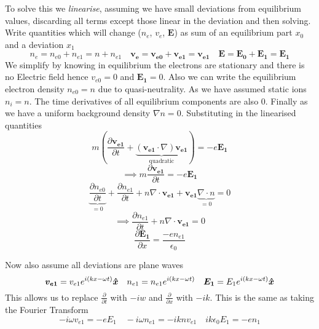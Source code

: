To solve this we \textit{linearise}, assuming we have small deviations from equilibrium values, discarding all terms except those linear in the deviation and then solving. Write quantities which will change ($n_e$, $v_e$, $\bm{E}$) as sum of an equilibrium part $x_0$ and a deviation $x_1$
\begin{equation}
	n_e = n_{e0} + n_{e1} = n + n_{e1} \quad \bm{v_e} = \bm{v_{e0}} + \bm{v_{e1}} = \bm{v_{e1}} \quad \bm{E} = \bm{E_0} + \bm{E_1} = \bm{E_1}
\end{equation}
We simplify by knowing in equilibrium the electrons are stationary and there is no Electric field hence $v_{e0} = 0$ and $\bm{E_1} = 0$. Also we can write the equilibrium electron density $n_{e0}=n$ due to quasi-neutrality. As we have assumed static ions $n_i = n$. The time derivatives of all equilibrium components are also $0$. Finally as we have a uniform background density $\nabla n = 0$. Substituting in the linearised quantities
\begin{equation}
	m \left( \frac{\partial \bm{v_{e1}}}{\partial t} + \underbrace{\left(\bm{v_{e1}} \cdot \nabla\right) \bm{v_{e1}}}_{\text{quadratic}}\right) = -e\bm{E_1}
\end{equation}
\begin{equation}
	\implies m\frac{\partial \bm{v_{e1}}}{\partial t} = -e\bm{E_1}
\end{equation}
\begin{equation}
	\underbrace{\frac{\partial n_{e0}}{\partial t}}_{=0} + \frac{\partial n_{e1}}{\partial t} + n \nabla \cdot \bm{v_{e1}} + \bm{v_{e1}} \underbrace{\nabla \cdot n}_{=0} = 0
\end{equation}
\begin{equation}
	\implies \frac{\partial n_{e1}}{\partial t} + n \nabla \cdot \bm{v_{e1}} = 0
\end{equation}
\begin{equation}
	\frac{\partial \bm{E_1}}{\partial x} = \frac{-en_{e1}}{\epsilon_0}
\end{equation}

Now also assume all deviations are plane waves
\begin{equation}
	\bm{v_{e1}} = v_{e1}e^{i(kx - \omega t)} \bm{\hat{x}} \quad n_{e1} = n_{e1}e^{i(kx - \omega t)} \quad \bm{E_1} = E_1 e^{i(kx - \omega t)} \bm{\hat{x}}
\end{equation}
This allows us to replace $\frac{\partial}{\partial t}$ with $-iw$ and $\frac{\partial}{\partial x}$ with $-ik$. This is the same as taking the Fourier Transform
\begin{equation}
	-i \omega v_{e1} = -eE_1 \quad -i\omega n_{e1} = -iknv_{e1} \quad ik\epsilon_0 E_1 = -en_1
\end{equation}

